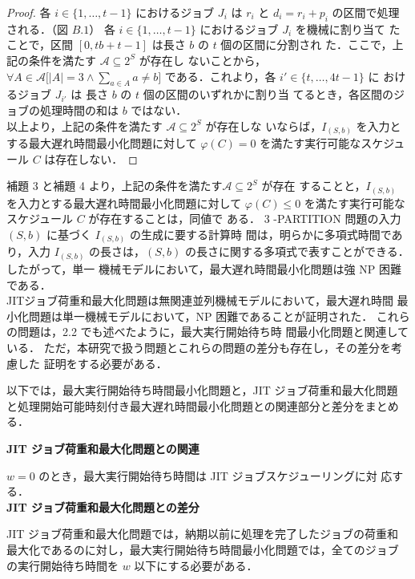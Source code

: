 \documentclass[12pt]{optlab-bachelor}
\begin{document}
\begin{proof}
  各 $i \in \{1,\ldots,t - 1\}$ におけるジョブ $J_i$ は $r_i$ と $d_i =
  r_i + p_i$ の区間で処理される．（図 $B.1$）
  各 $i \in \{1,\ldots,t - 1\}$ におけるジョブ $J_i$ を機械に割り当て
  たことで，区間 $[0,tb + t - 1]$ は長さ $b$ の $t$ 個の区間に分割され
  た．ここで，上記の条件を満たす $\mathcal{A} \subseteq 2^S$ が存在し
  ないことから，$\forall A \in \mathcal{A}\big[|A| = 3 \land \sum_{a \in
    A}a \neq b \big]$ である．これより，各 $i' \in \{t,\ldots,4t - 1\}$ に
  おけるジョブ $J_{i'}$ は 長さ $b$ の $t$ 個の区間のいずれかに割り当
  てるとき，各区間のジョブの処理時間の和は $b$ ではない．\\
  以上より，上記の条件を満たす $\mathcal{A} \subseteq 2^S$ が存在しな
  いならば，$I_{(S,b)}$ を入力とする最大遅れ時間最小化問題に対して
  $\varphi(C) = 0$ を満たす実行可能なスケジュール $C$ は存在しない．
\end{proof}

補題 3 と補題 4 より，上記の条件を満たす$\mathcal{A} \subseteq 2^S$ が存在
することと，$I_{(S,b)}$ を入力とする最大遅れ時間最小化問題に対して
$\varphi(C) \le  0$
を満たす実行可能なスケジュール $C$ が存在することは，同値で
ある．
3 -PARTITION 問題の入力 $(S,b)$ に基づく $I_{(S,b)}$ の生成に要する計算時
間は，明らかに多項式時間であり，入力 $I_{(S,b)}$ の長さは，$(S, b)$
の長さに関する多項式で表すことができる．したがって，単一
機械モデルにおいて，最大遅れ時間最小化問題は強 NP 困難である．\\

JITジョブ荷重和最大化問題は無関連並列機械モデルにおいて，最大遅れ時間
最小化問題は単一機械モデルにおいて，NP 困難であることが証明された．
これらの問題は，2.2 でも述べたように，最大実行開始待ち時
間最小化問題と関連している．
ただ，本研究で扱う問題とこれらの問題の差分も存在し，その差分を考慮した
証明をする必要がある．

以下では，最大実行開始待ち時間最小化問題と，JIT ジョブ荷重和最大化問題
と処理開始可能時刻付き最大遅れ時間最小化問題との関連部分と差分をまとめ
る．

\textbf{JIT ジョブ荷重和最大化問題との関連}

$w = 0$ のとき，最大実行開始待ち時間は JIT ジョブスケジューリングに対
応する．\\

\textbf{JIT ジョブ荷重和最大化問題との差分}

JIT ジョブ荷重和最大化問題では，納期以前に処理を完了したジョブの荷重和
最大化であるのに対し，最大実行開始待ち時間最小化問題では，全てのジョブ
の実行開始待ち時間を $w$ 以下にする必要がある．\\
\end{document}
